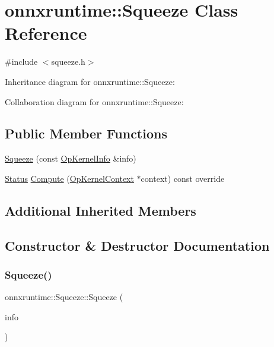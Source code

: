 \hypertarget{classonnxruntime_1_1Squeeze}{}\section{onnxruntime\+:\+:Squeeze Class Reference}
\label{classonnxruntime_1_1Squeeze}


{\ttfamily \#include $<$squeeze.\+h$>$}



Inheritance diagram for onnxruntime\+:\+:Squeeze\+:


Collaboration diagram for onnxruntime\+:\+:Squeeze\+:
\subsection*{Public Member Functions}
\begin{DoxyCompactItemize}
\item 
\mbox{\hyperlink{classonnxruntime_1_1Squeeze_ab332a4b18bdba15d1765d374ad6d8156}{Squeeze}} (const \mbox{\hyperlink{classonnxruntime_1_1OpKernelInfo}{Op\+Kernel\+Info}} \&info)
\item 
\mbox{\hyperlink{classonnxruntime_1_1common_1_1Status}{Status}} \mbox{\hyperlink{classonnxruntime_1_1Squeeze_a512bf812330bdf483f1b2b4d5a73efde}{Compute}} (\mbox{\hyperlink{classonnxruntime_1_1OpKernelContext}{Op\+Kernel\+Context}} $\ast$context) const override
\end{DoxyCompactItemize}
\subsection*{Additional Inherited Members}


\subsection{Constructor \& Destructor Documentation}
\mbox{\label{classonnxruntime_1_1Squeeze_ab332a4b18bdba15d1765d374ad6d8156}} 
\subsubsection{\texorpdfstring{Squeeze()}{Squeeze()}}
{\footnotesize\ttfamily onnxruntime\+::\+Squeeze\+::\+Squeeze (\begin{DoxyParamCaption}\item[{const \mbox{\hyperlink{classonnxruntime_1_1OpKernelInfo}{Op\+Kernel\+Info}} \&}]{info }\end{DoxyParamCaption})\hspace{0.3cm}{\ttfamily [inline]}}



